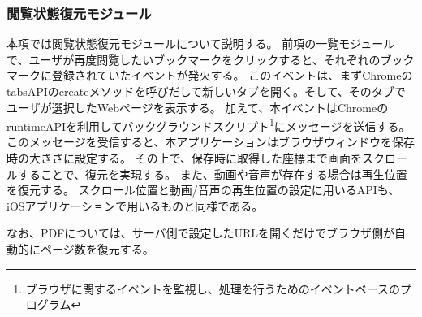 \subsubsection{閲覧状態復元モジュール}
本項では閲覧状態復元モジュールについて説明する。
前項の一覧モジュールで、ユーザが再度閲覧したいブックマークをクリックすると、それぞれのブックマークに登録されていたイベントが発火する。
このイベントは、まずChromeのtabsAPIのcreateメソッドを呼びだして新しいタブを開く。そして、そのタブでユーザが選択したWebページを表示する。
加えて、本イベントはChromeのruntimeAPI\cite{chrome-runtime-api}を利用してバックグラウンドスクリプト\footnote{ブラウザに関するイベントを監視し、処理を行うためのイベントベースのプログラム}にメッセージを送信する。
このメッセージを受信すると、本アプリケーションはブラウザウィンドウを保存時の大きさに設定する。
その上で、保存時に取得した座標まで画面をスクロールすることで、復元を実現する。
また、動画や音声が存在する場合は再生位置を復元する。
スクロール位置と動画/音声の再生位置の設定に用いるAPIも、iOSアプリケーションで用いるものと同様である。

なお、PDFについては、サーバ側で設定したURLを開くだけでブラウザ側が自動的にページ数を復元する。
